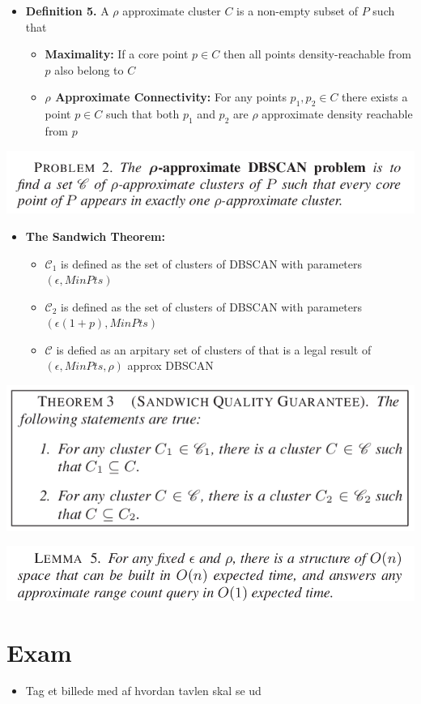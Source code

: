 \documentclass[11pt]{article}
\begin{document}
\begin{itemize}
\item \textbf{Definition 5.} A \(\rho\) approximate cluster \(C\) is a non-empty subset of \(P\) such that
\begin{itemize}
\item \textbf{Maximality:} If a core point \(p \in C\) then all points density-reachable from \(p\) also belong to \(C\)
\item \textbf{\(\rho\) Approximate Connectivity:} For any points \(p_1, p_2 \in C\) there exists a point \(p \in C\) such that both \(p_1\) and \(p_2\) are \(\rho\) approximate density reachable from \(p\)
\end{itemize}
\end{itemize}

\begin{center}
\includegraphics[width=.9\linewidth]{DBSCAN Revisted/screenshot_2018-12-05_16-05-59.png}
\end{center}

\begin{itemize}
\item \textbf{The Sandwich Theorem:}
\begin{itemize}
\item \(\mathcal C_1\) is defined as the set of clusters of DBSCAN with parameters \((\epsilon, MinPts)\)
\item \(\mathcal C_2\) is defined as the set of clusters of DBSCAN with parameters \((\epsilon(1+p), MinPts)\)
\item \(\mathcal C\) is defied as an arpitary set of clusters of that is a legal result of \((\epsilon, MinPts, \rho)\) approx DBSCAN
\end{itemize}
\end{itemize}

\begin{center}
\includegraphics[width=.9\linewidth]{DBSCAN Revisted/screenshot_2018-12-05_16-09-46.png}
\end{center}

\begin{center}
\includegraphics[width=.9\linewidth]{DBSCAN Revisted/screenshot_2018-12-05_16-18-07.png}
\end{center}

\section{Exam}
\label{sec:org20097db}
\begin{itemize}
\item Tag et billede med af hvordan tavlen skal se ud
\end{itemize}
\end{document}
